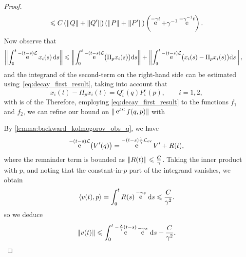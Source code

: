 \documentclass[11pt,a4paper]{article}
\DeclareMathOperator{\e}{e}
\renewcommand{\d}{\mathrm d}
\theoremstyle{plain}
\numberwithin{equation}{section}
\renewcommand{\leq}{\leqslant}
\begin{document}
\begin{proof}
\begin{equation}
        \leq C \left( \norm*{Q} +  \norm*{Q'}\right) \left( \norm*{P} + \norm*{P'} \right)
        \left(\e^{-\gamma t} + \gamma^{-1} \e^{-\gamma^{-1} t}\right).
    \end{equation}
    Now observe that
    \begin{align*}
        \norm{ \int_{0}^{t} \e^{- (t-s) \mathcal L}  x_i(s) \, \d s }
        &\leq \norm{ \int_{0}^{t} \e^{- (t-s) \mathcal L}  \bigl( \Pi_p x_i(s) \bigr) \d s }
        + \norm{ \int_{0}^{t} \e^{- (t-s) \mathcal L}  \bigl(x_i(s) - \Pi_p x_i(s)\bigr)  \d s},
    \end{align*}
    and the integrand of the second-term on the right-hand side can be estimated using~\eqref{eq:decay_first_result},
    taking into account that
    \[
        x_i(t) - \Pi_p x_i(t) = Q^s_i(q) P^s_i(p), \qquad i = 1, 2,
    \]
    with
    is of the 
    Therefore, employing \eqref{eq:decay_first_result} to the functions $f_1$ and $f_2$,
    we can refine our bound on $\norm*{ \e^{t \mathcal L} f(q,p) }$
    with

    By \cref{lemma:backward_kolmogorov_obs_q},
    we have
    \[
        \e^{- (t-s) \mathcal L} \bigl(V'(q)\bigr)
        = \e^{- (t-s) \frac{1}{\gamma}\mathcal L_{\rm ov}} V' + R(t),
    \]
    where the remainder term is bounded as $\norm{R(t)} \leq \frac{C}{\gamma}$.
    Taking the inner product with $p$,
    and noting that the constant-in-$p$ part of the integrand vanishes,
    we obtain
    \[
        \ip{v(t)}{p} = \int_{0}^{t} R(s) \e^{-\gamma s} \, \d s
        \leq \frac{C}{\gamma^2}.
    \]
    so we deduce
    \[
        \norm{v(t)} \leq \int_{0}^{t} \e^{- \frac{\lambda}{\gamma}(t-s)} \e^{- \gamma s} \, \d s + \frac{C}{\gamma^2}.
    \]
\end{proof}
\end{document}
